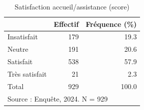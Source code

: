 \begin{table}[htbp]\centering
\def\sym#1{\ifmmode^{#1}\else\(^{#1}\)\fi}
\caption{Satisfaction accueil/assistance (score)}
\begin{tabular}{l*{2}{r}}
\toprule
            &    Effectif&Fréquence (\%)\\
\midrule
Insatisfait &         179&        19.3\\
Neutre      &         191&        20.6\\
Satisfait   &         538&        57.9\\
Très satisfait&          21&         2.3\\
Total       &         929&       100.0\\
\bottomrule
\multicolumn{3}{l}{\footnotesize Source : Enquête, 2024. N = 929}\\
\end{tabular}
\end{table}
